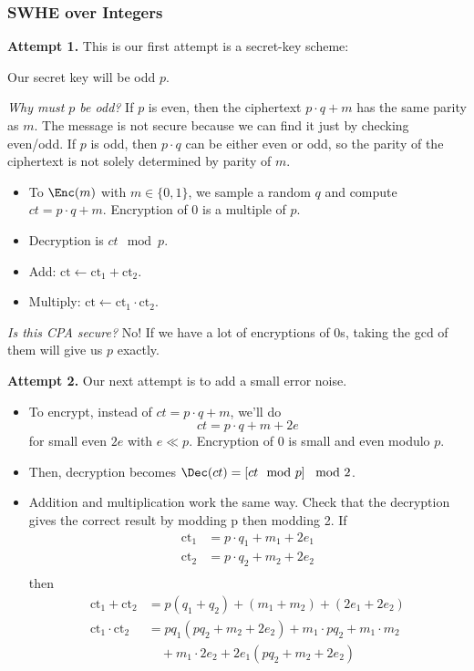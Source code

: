 \subsubsection{SWHE over Integers}\label{sec:apr06-swhe-integers}
\textbf{Attempt 1.} This is our first attempt is a secret-key scheme:

Our secret key will be odd $p$.

\begin{remark}
    \textit{Why must $p$ be odd?} If $p$ is even, then the ciphertext $p\cdot q + m$ has the same parity as $m$. The message is not secure because we can find it just by checking even/odd. If $p$ is odd, then $p\cdot q$ can be either even or odd, so the parity of the ciphertext is not solely determined by parity of $m$.
\end{remark}

\begin{itemize}
    \item To $\Enc(m)$ with $m\in \{0, 1\}$, we sample a random $q$ and compute $ct = p\cdot q + m$. Encryption of $0$ is a multiple of $p$.
    \item Decryption is $ct\mod p$.
    \item Add: $\text{ct} \gets \text{ct}_1 + \text{ct}_2$.
    \item Multiply: $\text{ct} \gets \text{ct}_1 \cdot \text{ct}_2 $.
\end{itemize}

\emph{Is this CPA secure?} No! If we have a lot of encryptions of $0$s, taking the gcd of them will give us $p$ exactly.

\textbf{Attempt 2.} Our next attempt is to add a small error noise.

\begin{itemize}
    \item To encrypt, instead of $ct = p\cdot q + m$, we'll do
          \[ct = p\cdot q + m + 2e\]
          for small even $2e$ with $e \ll p$. Encryption of $0$ is small and even modulo $p$.
    \item Then, decryption becomes $\Dec(ct) = \left[ ct\mod p \right]\mod 2$.
    \item Addition and multiplication work the same way. Check that the decryption gives the correct result by modding p then modding 2. If
    \begin{align*}
        \text{ct}_1 &= p \cdot q_1 + m_1 + 2e_1 \\
        \text{ct}_2 &= p \cdot q_2 + m_2 + 2e_2 \\
    \end{align*}
    then
    \begin{align*}
        \text{ct}_1 + \text{ct}_2 &= p(q_1 + q_2) + (m_1 + m_2) + (2e_1 + 2e_2)\\
        \text{ct}_1 \cdot \text{ct}_2 &= pq_1(pq_2 + m_2 + 2e_2) + m_1 \cdot pq_2 + m_1 \cdot m_2\\
        & \quad + m_1 \cdot 2e_2 + 2e_1(pq_2 + m_2 + 2e_2)\\
    \end{align*}
\end{itemize}



